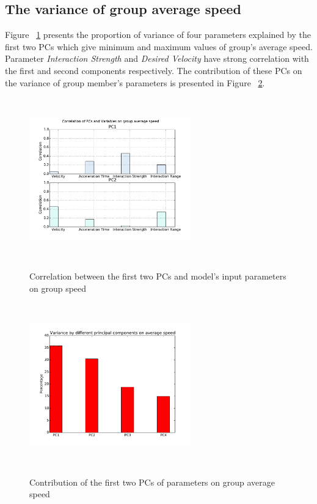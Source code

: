 \documentclass[a4paper,11pt,phdthesis,singlespace,twoside]{cssethesis}
\begin{document}
\subsection{The variance of group average speed}
Figure ~\ref{fig:pca_corr_group_speed} presents the proportion of variance of four parameters explained by the first two PCs which give minimum and maximum values of group's average speed. Parameter \textit{Interaction Strength} and \textit{Desired Velocity} have strong correlation with the first and second components respectively. The contribution of these PCs on the variance of group member's parameters is presented in Figure ~\ref{fig:pc_a_s.pdf}. 
\begin{figure}[H]
\begin{center}
{\includegraphics[width=7cm,height=7cm]{figs/pca_corr_group_speed.pdf}}
\end{center}
\caption{Correlation between the first two PCs and model's input parameters on group speed}
\label{fig:pca_corr_group_speed}
\end{figure}
\begin{figure}[H]
\begin{center}
{\includegraphics[width=7cm,height=7cm]{figs/pc_a_s.pdf}}
\end{center}
\caption{Contribution of the first two PCs of parameters on group average speed}
\label{fig:pc_a_s.pdf}
\end{figure}
\end{document}
